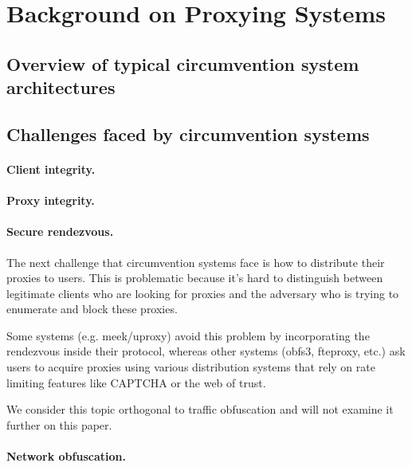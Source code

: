 %
\section{Background on Proxying Systems}
\label{section:proxying}


\subsection{Overview of typical circumvention system architectures}

\subsection{Challenges faced by circumvention systems}



\paragraph{Client integrity.} 


\paragraph{Proxy integrity.}


\paragraph{Secure rendezvous.}


The next challenge that circumvention systems face is how to
distribute their proxies to users. This is problematic because it's
hard to distinguish between legitimate clients who are looking for
proxies and the adversary who is trying to enumerate and block these
proxies.

Some systems (e.g. meek/uproxy) avoid this problem by incorporating
the rendezvous inside their protocol, whereas other systems (obfs3,
fteproxy, etc.) ask users to acquire proxies using various
distribution systems that rely on rate limiting features like CAPTCHA
or the web of trust.

We consider this topic orthogonal to traffic obfuscation and will not
examine it further on this paper.

\paragraph{Network obfuscation.} 




